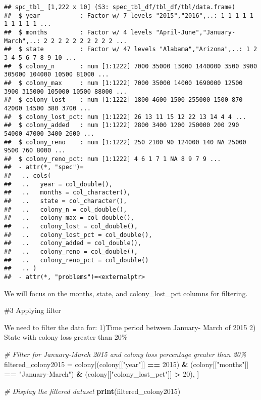 \documentclass[
]{article}
\newenvironment{Shaded}{\begin{snugshade}}{\end{snugshade}}
\newcommand{\CommentTok}[1]{\textcolor[rgb]{0.56,0.35,0.01}{\textit{#1}}}
\newcommand{\DecValTok}[1]{\textcolor[rgb]{0.00,0.00,0.81}{#1}}
\newcommand{\FunctionTok}[1]{\textcolor[rgb]{0.13,0.29,0.53}{\textbf{#1}}}
\newcommand{\NormalTok}[1]{#1}
\newcommand{\OtherTok}[1]{\textcolor[rgb]{0.56,0.35,0.01}{#1}}
\newcommand{\SpecialCharTok}[1]{\textcolor[rgb]{0.81,0.36,0.00}{\textbf{#1}}}
\newcommand{\StringTok}[1]{\textcolor[rgb]{0.31,0.60,0.02}{#1}}
\begin{document}
\begin{verbatim}
## spc_tbl_ [1,222 x 10] (S3: spec_tbl_df/tbl_df/tbl/data.frame)
##  $ year           : Factor w/ 7 levels "2015","2016",..: 1 1 1 1 1 1 1 1 1 1 ...
##  $ months         : Factor w/ 4 levels "April-June","January-March",..: 2 2 2 2 2 2 2 2 2 2 ...
##  $ state          : Factor w/ 47 levels "Alabama","Arizona",..: 1 2 3 4 5 6 7 8 9 10 ...
##  $ colony_n       : num [1:1222] 7000 35000 13000 1440000 3500 3900 305000 104000 10500 81000 ...
##  $ colony_max     : num [1:1222] 7000 35000 14000 1690000 12500 3900 315000 105000 10500 88000 ...
##  $ colony_lost    : num [1:1222] 1800 4600 1500 255000 1500 870 42000 14500 380 3700 ...
##  $ colony_lost_pct: num [1:1222] 26 13 11 15 12 22 13 14 4 4 ...
##  $ colony_added   : num [1:1222] 2800 3400 1200 250000 200 290 54000 47000 3400 2600 ...
##  $ colony_reno    : num [1:1222] 250 2100 90 124000 140 NA 25000 9500 760 8000 ...
##  $ colony_reno_pct: num [1:1222] 4 6 1 7 1 NA 8 9 7 9 ...
##  - attr(*, "spec")=
##   .. cols(
##   ..   year = col_double(),
##   ..   months = col_character(),
##   ..   state = col_character(),
##   ..   colony_n = col_double(),
##   ..   colony_max = col_double(),
##   ..   colony_lost = col_double(),
##   ..   colony_lost_pct = col_double(),
##   ..   colony_added = col_double(),
##   ..   colony_reno = col_double(),
##   ..   colony_reno_pct = col_double()
##   .. )
##  - attr(*, "problems")=<externalptr>
\end{verbatim}

We will focus on the months, state, and colony\_lost\_pct columns for
filtering.

\#3 Applying filter

We need to filter the data for: 1)Time period between January- March of
2015 2) State with colony loss greater than 20\%

\begin{Shaded}
\begin{Highlighting}[]
\CommentTok{\# Filter for January{-}March 2015 and colony loss percentage greater than 20\%}
\NormalTok{filtered\_colony2015 }\OtherTok{=}\NormalTok{ colony[(colony[[}\StringTok{"year"}\NormalTok{]] }\SpecialCharTok{==} \DecValTok{2015}\NormalTok{) }\SpecialCharTok{\&} 
\NormalTok{                        (colony[[}\StringTok{"months"}\NormalTok{]] }\SpecialCharTok{==} \StringTok{"January{-}March"}\NormalTok{) }\SpecialCharTok{\&} 
\NormalTok{                        (colony[[}\StringTok{"colony\_lost\_pct"}\NormalTok{]] }\SpecialCharTok{\textgreater{}} \DecValTok{20}\NormalTok{), ]}

\CommentTok{\# Display the filtered dataset}
\FunctionTok{print}\NormalTok{(filtered\_colony2015)}
\end{Highlighting}
\end{Shaded}
\end{document}
